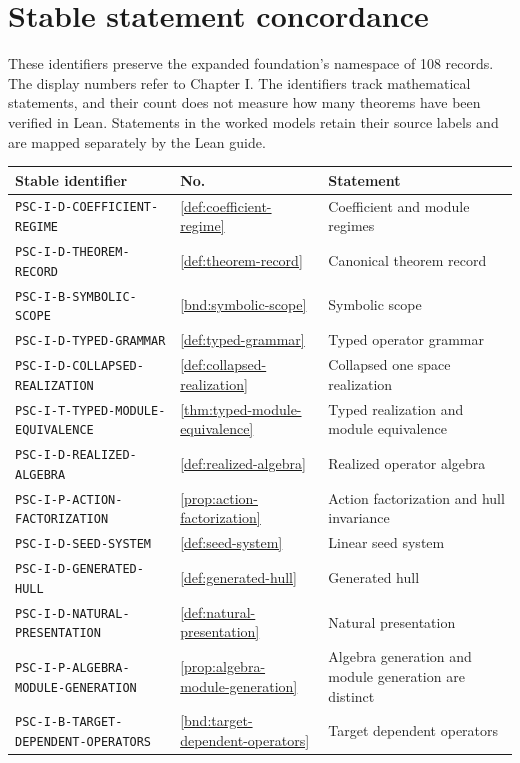 \section{Stable statement concordance}\label{app:stable-concordance}
These identifiers preserve the expanded foundation's namespace of 108 records. The display numbers refer to Chapter I. The identifiers track mathematical statements, and their count does not measure how many theorems have been verified in Lean. Statements in the worked models retain their source labels and are mapped separately by the Lean guide.
\small\begin{longtable}{@{}p{}p{}p{}@{}}
\toprule Stable identifier & No. & Statement\\\midrule\endhead
\nolinkurl{PSC-I-D-COEFFICIENT-REGIME} & \ref{def:coefficient-regime} & Coefficient and module regimes \\
\nolinkurl{PSC-I-D-THEOREM-RECORD} & \ref{def:theorem-record} & Canonical theorem record \\
\nolinkurl{PSC-I-B-SYMBOLIC-SCOPE} & \ref{bnd:symbolic-scope} & Symbolic scope \\
\nolinkurl{PSC-I-D-TYPED-GRAMMAR} & \ref{def:typed-grammar} & Typed operator grammar \\
\nolinkurl{PSC-I-D-COLLAPSED-REALIZATION} & \ref{def:collapsed-realization} & Collapsed one space realization \\
\nolinkurl{PSC-I-T-TYPED-MODULE-EQUIVALENCE} & \ref{thm:typed-module-equivalence} & Typed realization and module equivalence \\
\nolinkurl{PSC-I-D-REALIZED-ALGEBRA} & \ref{def:realized-algebra} & Realized operator algebra \\
\nolinkurl{PSC-I-P-ACTION-FACTORIZATION} & \ref{prop:action-factorization} & Action factorization and hull invariance \\
\nolinkurl{PSC-I-D-SEED-SYSTEM} & \ref{def:seed-system} & Linear seed system \\
\nolinkurl{PSC-I-D-GENERATED-HULL} & \ref{def:generated-hull} & Generated hull \\
\nolinkurl{PSC-I-D-NATURAL-PRESENTATION} & \ref{def:natural-presentation} & Natural presentation \\
\nolinkurl{PSC-I-P-ALGEBRA-MODULE-GENERATION} & \ref{prop:algebra-module-generation} & Algebra generation and module generation are distinct \\
\nolinkurl{PSC-I-B-TARGET-DEPENDENT-OPERATORS} & \ref{bnd:target-dependent-operators} & Target dependent operators \\

\end{longtable}
